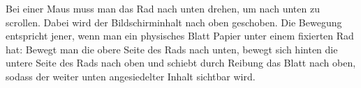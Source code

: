 Bei einer Maus muss man das Rad nach unten drehen, um nach unten zu scrollen. 
Dabei wird der Bildschirminhalt nach oben geschoben. 
Die Bewegung entspricht jener, 
wenn man ein physisches Blatt Papier unter einem fixierten Rad hat: 
Bewegt man die obere Seite des Rads nach unten, 
bewegt sich hinten die untere Seite des Rads nach oben und schiebt durch Reibung das Blatt nach oben, 
sodass der weiter unten angesiedelter Inhalt sichtbar wird.